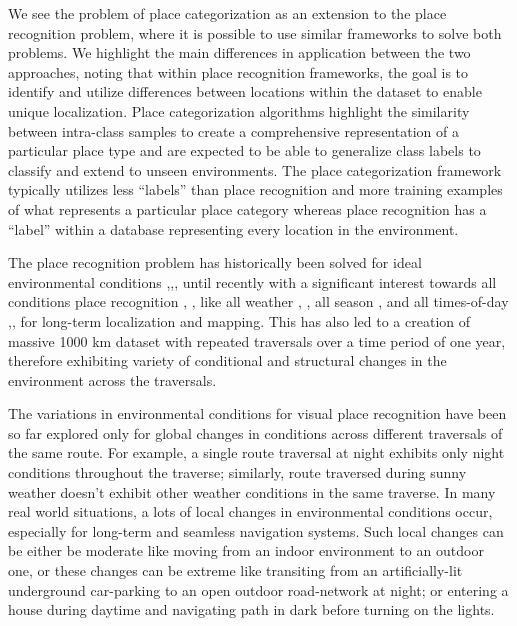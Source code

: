 \documentclass[letterpaper, 10 pt, conference]{ieeeconf}  %
\begin{document}
We see the problem of place categorization as an extension to the place recognition problem, where it is possible to use similar frameworks to solve both problems. We highlight the main differences in application between the two approaches, noting that within place recognition frameworks, the goal is to identify and utilize differences between locations within the dataset to enable unique localization. Place categorization algorithms highlight the similarity between intra-class samples to create a comprehensive representation of a particular place type and are expected to be able to generalize class labels to classify and extend to unseen environments. The place categorization framework typically utilizes less ``labels'' than place recognition and more training examples of what represents a particular place category whereas place recognition has a ``label'' within a database representing every location in the environment. 

The place recognition problem has historically been solved for ideal environmental conditions \cite{thompson1993vision},\cite{ulrich2000appearance},\cite{Cummins2009},\cite{kejriwal2016high} until recently with a significant interest towards all conditions place recognition \cite{Milford2012}, \cite{lowry2016supervised}, like all weather \cite{linegar2016made}, \cite{pepperell2016routed}, all season \cite{McManus2015}, \cite{chen2017deep} and all times-of-day \cite{linegar2015work},\cite{Maddern},\cite{nelson2015dusk} for long-term localization and mapping. This has also led to a creation of massive 1000 km dataset \cite{maddern20161} with repeated traversals over a time period of one year, therefore exhibiting variety of conditional and structural changes in the environment across the traversals.

The variations in environmental conditions for visual place recognition have been so far explored only for global changes in conditions across different traversals of the same route. For example, a single route traversal at night exhibits only night conditions throughout the traverse; similarly, route traversed during sunny weather doesn't exhibit other weather conditions in the same traverse. In many real world situations, a lots of local changes in environmental conditions occur, especially for long-term and seamless navigation systems. Such local changes can be either be moderate like moving from an indoor environment to an outdoor one, or these changes can be extreme like transiting from an artificially-lit underground car-parking to an open outdoor road-network at night; or entering a house during daytime and navigating path in dark before turning on the lights.  
\end{document}
